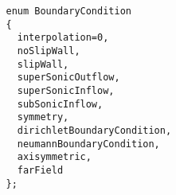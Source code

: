 

 {\footnotesize
 \begin{verbatim}
   enum BoundaryCondition
   {
     interpolation=0,
     noSlipWall,
     slipWall,
     superSonicOutflow,
     superSonicInflow,
     subSonicInflow,
     symmetry,
     dirichletBoundaryCondition,
     neumannBoundaryCondition,
     axisymmetric,
     farField
   };
 \end{verbatim}
 }
